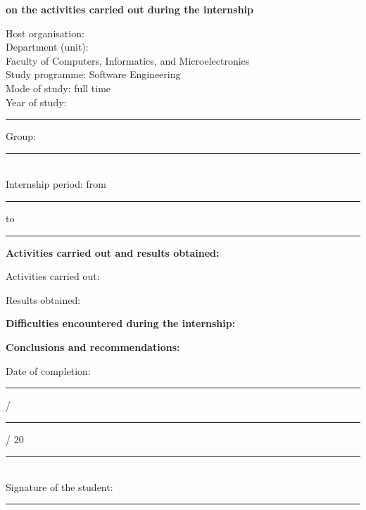 \begin{center}
\textbf{on the activities carried out during the internship}
\end{center}
\noindent Host organisation: \hrulefill\\
Department (unit): \hrulefill\\
Faculty of Computers, Informatics, and Microelectronics\\
Study programme: Software Engineering\\
Mode of study: full time\\
Year of study: \rule{1cm}{0.3pt}\quad Group: \rule{2cm}{0.3pt}\\
Internship period: from \rule{2cm}{0.3pt}\quad to \rule{2cm}{0.3pt}

\noindent\textbf{Activities carried out and results obtained:}

\noindent Activities carried out: \hrulefill\par\vspace{0.3cm}
\noindent Results obtained: \hrulefill\par\vspace{0.3cm}
\noindent\textbf{Difficulties encountered during the internship:}\par
\noindent\hrulefill\par\vspace{0.3cm}
\noindent\textbf{Conclusions and recommendations:}\par
\noindent\hrulefill\par\vspace{0.3cm}
\noindent\hrulefill\par\vspace{0.3cm}
\noindent Date of completion: \rule{0.6cm}{0.3pt} / \rule{0.6cm}{0.3pt} / 20\rule{0.6cm}{0.3pt}\\
Signature of the student: \rule{4cm}{0.3pt}
